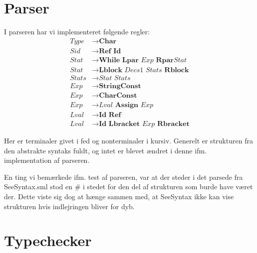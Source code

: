 \documentclass[a4paper, 10pt]{article}
\newcommand{\ra}[0]{\rightarrow}
\begin{document}
\section{Parser}
I parseren har vi implementeret følgende regler:
\begin{align*}
    \textit{Type}  & \ra \textbf{Char} \\
    \textit{Sid}   & \ra \textbf{Ref Id} \\
    \textit{Stat}  & \ra \textbf{While Lpar} \textit{ Exp } \textbf{Rpar}
                         \textit{Stat} \\
    \textit{Stat}  & \ra \textbf{Lblock} \textit{ Decs1 Stats } \textbf{Rblock} \\
    \textit{Stats} & \ra \textit{Stat Stats} \\
    \textit{Exp}   & \ra \textbf{StringConst} \\
    \textit{Exp}   & \ra \textbf{CharConst} \\
    \textit{Exp}   & \ra \textit{Lval} \textbf{ Assign } \textit{Exp} \\
    \textit{Lval}  & \ra \textbf{Id Ref} \\
    \textit{Lval}  & \ra \textbf{Id Lbracket} \textit{ Exp } \textbf{Rbracket}
\end{align*}

Her er terminaler givet i fed og nonterminaler i kursiv. Generelt er strukturen
fra den abstrakte syntaks fuldt, og intet er blevet ændret i denne ifm.
implementation af parseren.


En ting vi bemærkede ifm. test af parseren, var at der steder i det parsede fra
SeeSyntax.sml stod en # i stedet for den del af strukturen som burde have været
der. Dette viste sig dog at hænge sammen med, at SeeSyntax ikke kan vise
strukturen hvis indlejringen bliver for dyb.

\section{Typechecker}




\end{document}

